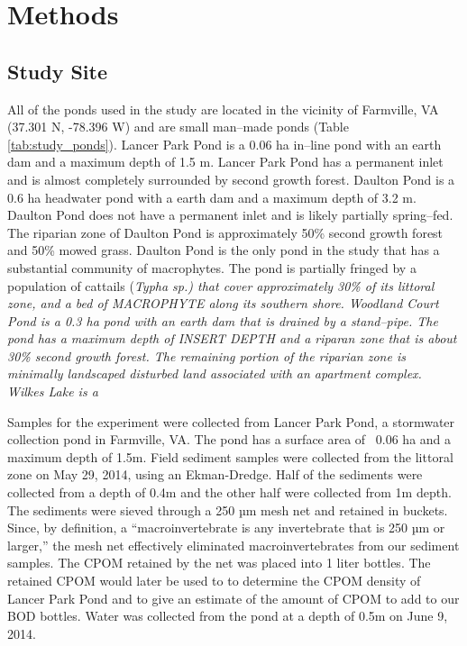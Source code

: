 \section{Methods}
\subsection{Study Site}
All of the ponds used in the study are located in the vicinity of Farmville, VA (37.301 N, -78.396 W) and are small man--made ponds (Table \ref{tab:study_ponds}).  Lancer Park Pond is a 0.06 ha in--line pond with an earth dam and a maximum depth of 1.5 m. Lancer Park Pond has a permanent inlet and is almost completely surrounded by second growth forest. Daulton Pond is a 0.6 ha headwater pond with a earth dam and a maximum depth of 3.2 m. Daulton Pond does not have a permanent inlet and is likely partially spring--fed. The riparian zone of Daulton Pond is approximately 50\% second growth forest and 50\% mowed grass. Daulton Pond is the only pond in the study that has a substantial community of macrophytes. The pond is partially fringed by a population of cattails (\em{Typha sp.}) that cover approximately 30\% of its littoral zone, and a bed of MACROPHYTE along its southern shore. Woodland Court Pond is a 0.3 ha pond with an earth dam that is drained by a stand--pipe. The pond has a maximum depth of INSERT DEPTH and a riparan zone that is about 30\% second growth forest. The remaining portion of the riparian zone is minimally landscaped disturbed land associated with an apartment complex. Wilkes Lake is a 


Samples for the experiment were collected from Lancer Park Pond, a stormwater collection pond in Farmville, VA. The pond has a surface area of ~0.06 ha and a maximum depth of 1.5m. Field sediment samples were collected from the littoral zone on May 29, 2014, using an Ekman-Dredge. Half of the sediments were collected from a depth of 0.4m and the other half were collected from 1m depth. The sediments were sieved through a 250 µm mesh net and retained in buckets. Since, by definition, a “macroinvertebrate is any invertebrate that is 250 µm or larger,” the mesh net effectively eliminated macroinvertebrates from our sediment samples. The CPOM retained by the net was placed into 1 liter bottles. The retained CPOM would later be used to to determine the CPOM density of Lancer Park Pond and to give an estimate of the amount of CPOM to add to our BOD bottles. Water was collected from the pond at a depth of 0.5m on June 9, 2014.
    
